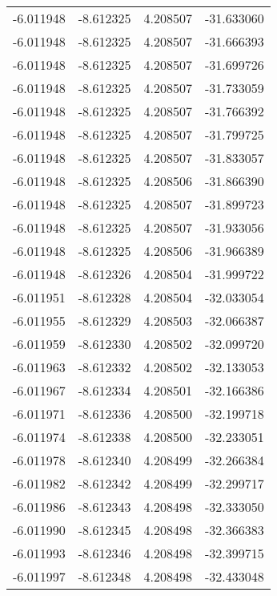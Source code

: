 \begin{tabular}{rrrr}
       -6.011948 &        -8.612325 &    4.208507 & -31.633060 \\
       -6.011948 &        -8.612325 &    4.208507 & -31.666393 \\
       -6.011948 &        -8.612325 &    4.208507 & -31.699726 \\
       -6.011948 &        -8.612325 &    4.208507 & -31.733059 \\
       -6.011948 &        -8.612325 &    4.208507 & -31.766392 \\
       -6.011948 &        -8.612325 &    4.208507 & -31.799725 \\
       -6.011948 &        -8.612325 &    4.208507 & -31.833057 \\
       -6.011948 &        -8.612325 &    4.208506 & -31.866390 \\
       -6.011948 &        -8.612325 &    4.208507 & -31.899723 \\
       -6.011948 &        -8.612325 &    4.208507 & -31.933056 \\
       -6.011948 &        -8.612325 &    4.208506 & -31.966389 \\
       -6.011948 &        -8.612326 &    4.208504 & -31.999722 \\
       -6.011951 &        -8.612328 &    4.208504 & -32.033054 \\
       -6.011955 &        -8.612329 &    4.208503 & -32.066387 \\
       -6.011959 &        -8.612330 &    4.208502 & -32.099720 \\
       -6.011963 &        -8.612332 &    4.208502 & -32.133053 \\
       -6.011967 &        -8.612334 &    4.208501 & -32.166386 \\
       -6.011971 &        -8.612336 &    4.208500 & -32.199718 \\
       -6.011974 &        -8.612338 &    4.208500 & -32.233051 \\
       -6.011978 &        -8.612340 &    4.208499 & -32.266384 \\
       -6.011982 &        -8.612342 &    4.208499 & -32.299717 \\
       -6.011986 &        -8.612343 &    4.208498 & -32.333050 \\
       -6.011990 &        -8.612345 &    4.208498 & -32.366383 \\
       -6.011993 &        -8.612346 &    4.208498 & -32.399715 \\
       -6.011997 &        -8.612348 &    4.208498 & -32.433048 \\

\end{tabular}

